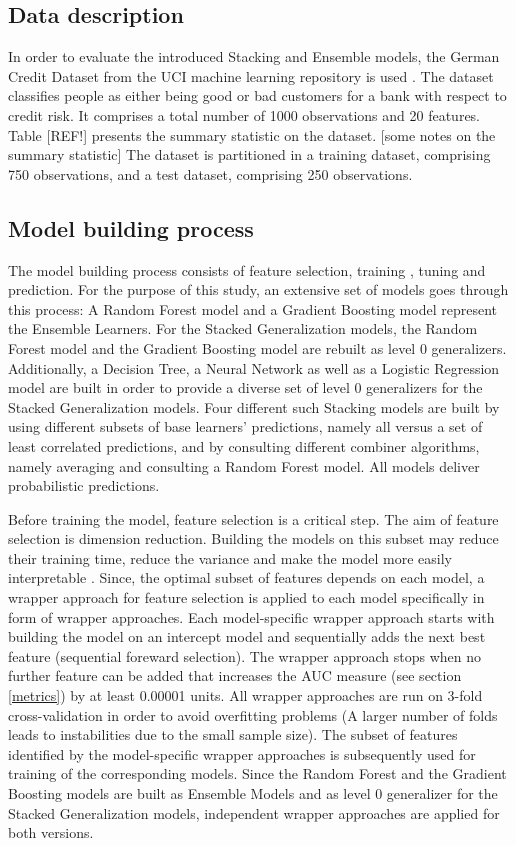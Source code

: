 \documentclass[12pt]{article}
\begin{document}
\subsection{Data description}
In order to evaluate the introduced Stacking and Ensemble models, the German Credit Dataset from the UCI machine learning repository is used \citep{dataset}. The dataset classifies people as either being good or bad customers for a bank with respect to credit risk. It comprises a total number of 1000 observations and 20 features. Table [REF!] presents the summary statistic on the dataset. [some notes on the summary statistic] The dataset is partitioned in a training dataset, comprising 750 observations, and a test dataset, comprising 250 observations.

\subsection{Model building process}
The model building process consists of feature selection, training , tuning and prediction. For the purpose of this study, an extensive set
of models goes through this process: A Random Forest model and a Gradient Boosting model represent the Ensemble Learners. For the Stacked Generalization models, the Random Forest model and the Gradient Boosting model are rebuilt as level 0 generalizers. Additionally, a Decision Tree, a Neural Network as well as a Logistic Regression model are built in order to provide a diverse set of level 0 generalizers for the Stacked Generalization models. Four different such Stacking models are built by using different subsets of base learners' predictions, namely all versus a set of least correlated predictions, and by consulting different combiner algorithms, namely averaging and consulting a Random Forest model. All models deliver probabilistic predictions. 

Before training the model, feature selection is a critical step. The aim of feature selection is dimension reduction. Building the models on this subset may reduce their training time, reduce the variance and make the model more easily interpretable \citep{guyon2003introduction}. Since, the optimal subset of features depends on each model, a wrapper approach for feature selection is applied to each model specifically in form of wrapper approaches. Each model-specific wrapper approach starts with building the model on an intercept model and sequentially adds the next best feature (sequential foreward selection). The wrapper approach stops when no further feature can be added that increases the AUC measure (see section \ref{metrics}) by at least 0.00001 units. All wrapper approaches are run on 3-fold cross-validation in order to avoid overfitting problems (A larger number of folds leads to instabilities due to the small sample size). The subset of features identified by the model-specific wrapper approaches is subsequently used for training of the corresponding models. Since the Random Forest and the Gradient Boosting models are built as Ensemble Models and as level 0 generalizer for the Stacked Generalization models, independent wrapper approaches are applied for both versions.
\end{document}
